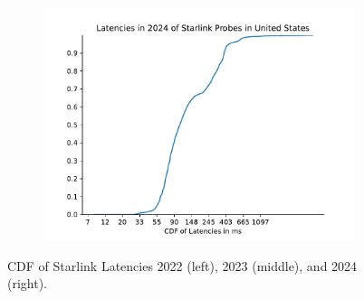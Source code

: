 \begin{figure}
\begin{subfigure}[b]{0.3\linewidth}
		\includegraphics[width=\linewidth]{chapters/4-results/latency/img/cdf_latencies_in_2024_of_starlink_probes_in_united_states.pdf}
	\end{subfigure}
	\caption{CDF of Starlink Latencies 2022 (left), 2023 (middle), and 2024 (right).}
	\label{fig:latency-cdfs-usa}
\end{figure}

